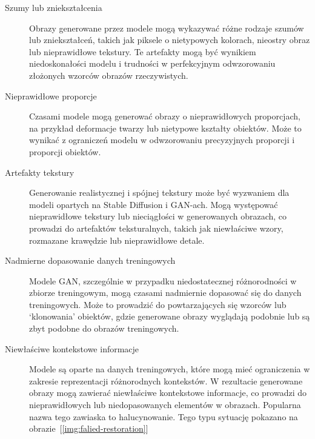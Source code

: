 \begin{description}

    \item[Szumy lub zniekształcenia] Obrazy generowane przez modele mogą wykazywać różne rodzaje szumów lub zniekształceń, takich jak piksele o nietypowych kolorach, nieostry obraz lub nieprawidłowe tekstury.
    Te artefakty mogą być wynikiem niedoskonałości modelu i trudności w perfekcyjnym odwzorowaniu złożonych wzorców obrazów rzeczywistych.

    \item[Nieprawidłowe proporcje] Czasami modele mogą generować obrazy o nieprawidłowych proporcjach, na przykład deformacje twarzy lub nietypowe kształty obiektów.
    Może to wynikać z ograniczeń modelu w odwzorowaniu precyzyjnych proporcji i proporcji obiektów.

    \item[Artefakty tekstury] Generowanie realistycznej i spójnej tekstury może być wyzwaniem dla modeli opartych na Stable Diffusion i GAN-ach.
    Mogą występować nieprawidłowe tekstury lub nieciągłości w generowanych obrazach, co prowadzi do artefaktów teksturalnych, takich jak niewłaściwe wzory, rozmazane krawędzie lub nieprawidłowe detale.

    \item[Nadmierne dopasowanie danych treningowych] Modele GAN, szczególnie w przypadku niedostatecznej różnorodności w zbiorze treningowym, mogą czasami nadmiernie dopasować się do danych treningowych.
    Może to prowadzić do powtarzających się wzorców lub `klonowania' obiektów, gdzie generowane obrazy wyglądają podobnie lub są zbyt podobne do obrazów treningowych.

    \item[Niewłaściwe kontekstowe informacje] Modele są oparte na danych treningowych, które mogą mieć ograniczenia w zakresie reprezentacji różnorodnych kontekstów.
    W rezultacie generowane obrazy mogą zawierać niewłaściwe kontekstowe informacje, co prowadzi do nieprawidłowych lub niedopasowanych elementów w obrazach.
    Popularna nazwa tego zawiaska to halucynowanie.
    Tego typu sytuację pokazano na obrazie~[\ref{img:falied-restoration}]

\end{description}

